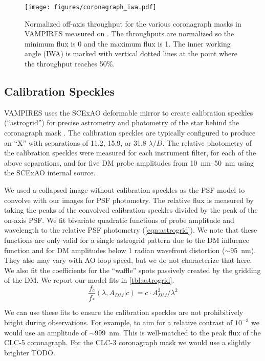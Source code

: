 \begin{figure}
    \centering
    \texttt{[image: figures/coronagraph\_iwa.pdf]}
    \caption{Normalized off-axis throughput for the various coronagraph masks in VAMPIRES measured on . The throughputs are normalized so the minimum flux is 0 and the maximum flux is 1. The inner working angle (IWA) is marked with vertical dotted lines at the point where the throughput reaches 50\%.\label{fig:iwa}}
\end{figure}

\subsection{Calibration Speckles}

VAMPIRES uses the SCExAO deformable mirror to create calibration speckles (``astrogrid'') for precise astrometry and photometry of the star behind the coronagraph mask \citep{sahoo_precision_2020}. The calibration speckles are typically configured to produce an ``X'' with separations of 11.2, 15.9, or 31.8 $\lambda/D$. The relative photometry of the calibration speckles were measured for each instrument filter, for each of the above separations, and for five DM probe amplitudes from \SIrange{10}{50}{\nano\meter} using the SCExAO internal source. 

We used a collapsed image without calibration speckles as the PSF model to convolve with our images for PSF photometry. The relative flux is measured by taking the peaks of the convolved calibration speckles divided by the peak of the on-axis PSF. We fit bivariate quadratic functions of probe amplitude and wavelength to the relative PSF photometry (\autoref{eqn:astrogrid}). We note that these functions are only valid for a single astrogrid pattern due to the DM influence function and for DM amplitudes below 1 radian wavefront distortion ($\sim$\SI{95}{\nano\meter}). They also may vary with AO loop speed, but we do not characterize that here. We also fit the coefficients for the ``waffle'' spots passively created by the gridding of the DM. We report our model fits in \autoref{tbl:astrogrid}.
\begin{equation}
    \label{eqn:astrogrid}
    \frac{f_{c}}{f_*}\left( \lambda, A_{DM} | c \right) = c \cdot A_{DM}^2 / \lambda^2
\end{equation}

We can use these fits to ensure the calibration speckles are not prohibitively bright during observations. For example, to aim for a relative contrast of $10^{-3}$ we would use an amplitude of $\sim$\SI{999}{\nano\meter}. This is well-matched to the peak flux of the CLC-5 coronagraph. For the CLC-3 coronagraph mask we would use a slightly brighter TODO.


